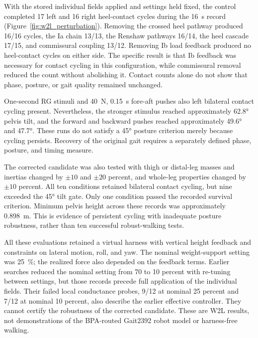 With the stored individual fields applied and settings held fixed, the control completed 17 left and 16 right heel-contact cycles during the \qty{16}{\second} record (Figure~\ref{fig:w2l_perturbation}). Removing the crossed heel pathway produced 16/16 cycles, the Ia chain 13/13, the Renshaw pathways 16/14, the heel cascade 17/15, and commissural coupling 13/12. Removing Ib load feedback produced no heel-contact cycles on either side. The specific result is that Ib feedback was necessary for contact cycling in this configuration, while commissural removal reduced the count without abolishing it. Contact counts alone do not show that phase, posture, or gait quality remained unchanged.

One-second RG stimuli and \qty{40}{\newton}, \qty{0.15}{\second} fore-aft pushes also left bilateral contact cycling present. Nevertheless, the stronger stimulus reached approximately \ang{62.8} pelvis tilt, and the forward and backward pushes reached approximately \ang{49.6} and \ang{47.7}. These runs do not satisfy a \ang{45} posture criterion merely because cycling persists. Recovery of the original gait requires a separately defined phase, posture, and timing measure.

The corrected candidate was also tested with thigh or distal-leg masses and inertias changed by $\pm10$ and $\pm20$ percent, and whole-leg properties changed by $\pm10$ percent. All ten conditions retained bilateral contact cycling, but nine exceeded the \ang{45} tilt gate. Only one condition passed the recorded survival criterion. Minimum pelvis height across these records was approximately \qty{0.898}{\metre}. This is evidence of persistent cycling with inadequate posture robustness, rather than ten successful robust-walking tests.

All these evaluations retained a virtual harness with vertical height feedback and constraints on lateral motion, roll, and yaw. The nominal weight-support setting was \qty{25}{\percent}; the realized force also depended on the feedback terms. Earlier searches reduced the nominal setting from 70 to 10 percent with re-tuning between settings, but those records precede full application of the individual fields. Their failed local conductance probes, 9/12 at nominal 25 percent and 7/12 at nominal 10 percent, also describe the earlier effective controller. They cannot certify the robustness of the corrected candidate. These are W2L results, not demonstrations of the BPA-routed Gait2392 robot model or harness-free walking.

